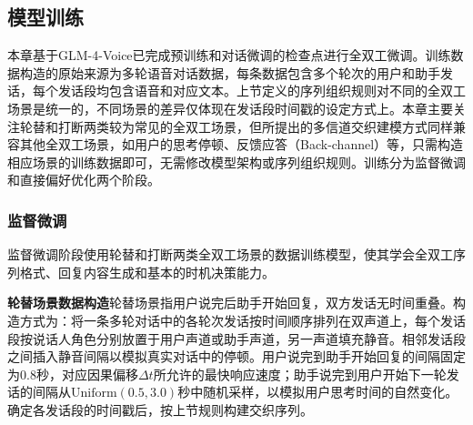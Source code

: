 
\subsection{模型训练}

本章基于GLM-4-Voice已完成预训练和对话微调的检查点进行全双工微调。训练数据构造的原始来源为多轮语音对话数据，每条数据包含多个轮次的用户和助手发话，每个发话段均包含语音和对应文本。上节定义的序列组织规则对不同的全双工场景是统一的，不同场景的差异仅体现在发话段时间戳的设定方式上。本章主要关注轮替和打断两类较为常见的全双工场景，但所提出的多信道交织建模方式同样兼容其他全双工场景，如用户的思考停顿、反馈应答（Back-channel）等，只需构造相应场景的训练数据即可，无需修改模型架构或序列组织规则。训练分为监督微调和直接偏好优化两个阶段。

\subsubsection{监督微调}

监督微调阶段使用轮替和打断两类全双工场景的数据训练模型，使其学会全双工序列格式、回复内容生成和基本的时机决策能力。

\textbf{轮替场景数据构造}\quad 轮替场景指用户说完后助手开始回复，双方发话无时间重叠。构造方式为：将一条多轮对话中的各轮次发话按时间顺序排列在双声道上，每个发话段按说话人角色分别放置于用户声道或助手声道，另一声道填充静音。相邻发话段之间插入静音间隔以模拟真实对话中的停顿。用户说完到助手开始回复的间隔固定为0.8秒，对应因果偏移$\Delta t$所允许的最快响应速度；助手说完到用户开始下一轮发话的间隔从$\text{Uniform}(0.5, 3.0)$秒中随机采样，以模拟用户思考时间的自然变化。确定各发话段的时间戳后，按上节规则构建交织序列。


